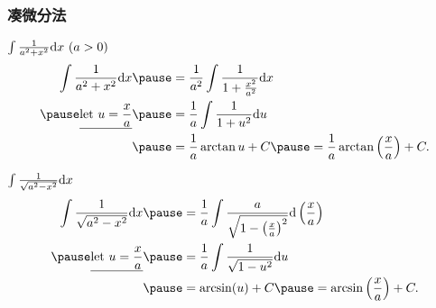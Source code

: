 \documentclass[
10pt,
aspectratio=43,
]{beamer}
\begin{document}
\begin{frame}
	\frametitle{凑微分法}
	\everymath{\displaystyle}
	{\small
		\begin{exampleblock}{$\color{black}\int \frac{1}{a^2+x^2} \mathrm{d}x\,\,(a>0)$}
			$$
				\begin{aligned}
					\int \frac{1}{a^2+x^2} \mathrm{d}x         & \pause = \frac{1}{a^2} \int \frac{1}{1+\frac{x^2}{a^2}} \mathrm{d}x                      \\
					\pause\underline{\text{let }u=\frac{x}{a}} & \pause =  \frac{1}{a} \int \frac{1}{1+u^2} \mathrm{d}u                                   \\
					                                           & \pause = \frac{1}{a} \arctan u+C \pause = \frac{1}{a} \arctan\left(\frac{x}{a}\right)+C.
				\end{aligned}
			$$
		\end{exampleblock}
		\pause
		\begin{exampleblock}{$\color{black}\int \frac{1}{\sqrt{a^2-x^2}} \mathrm{d}x$}
			$$
				\begin{aligned}
					\int \frac{1}{\sqrt{a^2-x^2}} \mathrm{d}x  & \pause = \frac{1}{a} \int \frac{a}{\sqrt{1-\left(\frac{x}{a}\right)^2}} \mathrm{d}\left(\frac{x}{a}\right) \\
					\pause\underline{\text{let }u=\frac{x}{a}} & \pause =  \frac{1}{a} \int \frac{1}{\sqrt{1-u^2}} \mathrm{d}u                                              \\
					                                           & \pause = \arcsin(u)+C \pause = \arcsin\left(\frac{x}{a}\right)+C.
				\end{aligned}
			$$
		\end{exampleblock}
	}
\end{frame}
\end{document}
